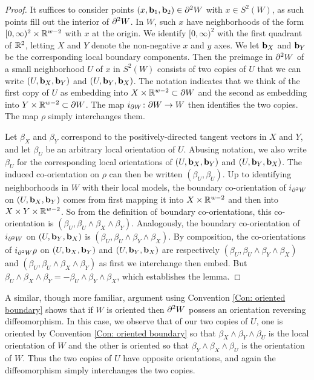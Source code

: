 \begin{proof}
	It suffices to consider points $(x,\mathbf{b}_1,\mathbf{b}_2) \in \partial^2 W$ with $x \in S^2(W)$, as such points fill out the interior of $\partial^2 W$.
	In $W$, such $x$ have neighborhoods of the form $[0,\infty)^2 \times \mathbb{R}^{w-2}$ with $x$ at the origin.
	We identify $[0,\infty)^2$ with the first quadrant of $\mathbb{R}^2$, letting $X$ and $Y$ denote the non-negative $x$ and $y$ axes.
	We let $\mathbf{b}_X$ and $\mathbf{b}_Y$ be the corresponding local boundary components.
	Then the preimage in $\partial^2 W$ of a small neighborhood $U$ of $x$ in $S^2(W)$ consists of two copies of $U$ that we can write $(U,\mathbf{b}_X,\mathbf{b}_Y)$ and $(U,\mathbf{b}_Y,\mathbf{b}_X)$.
	The notation indicates that we think of the first copy of $U$ as embedding into $X \times \mathbb{R}^{w-2} \subset \partial W$ and the second as embedding into $Y \times \mathbb{R}^{w-2} \subset \partial W$.
	The map $i_{\partial W} \colon \partial W \to W$ then identifies the two copies.
	The map $\rho$ simply interchanges them.

	Let $\beta_X$ and $\beta_Y$ correspond to the positively-directed tangent vectors in $X$ and $Y$, and let $\beta_U$ be an arbitrary local orientation of $U$.
	Abusing notation, we also write $\beta_U$ for the corresponding local orientations of $(U,\mathbf{b}_X,\mathbf{b}_Y)$ and $(U,\mathbf{b}_Y,\mathbf{b}_X)$.
	The induced co-orientation on $\rho$ can then be written $(\beta_U,\beta_U)$.
	Up to identifying neighborhoods in $W$ with their local models, the boundary co-orientation of $i_{\partial^2 W}$ on $(U,\mathbf{b}_X,\mathbf{b}_Y)$ comes from first mapping it into $X \times \mathbb{R}^{w-2}$ and then into $X \times Y \times \mathbb{R}^{w-2}$.
	So from the definition of boundary co-orientations, this co-orientation is $(\beta_U, \beta_U \wedge \beta_X \wedge \beta_Y)$.
	Analogously, the boundary co-orientation of $i_{\partial^2 W}$ on $(U,\mathbf{b}_Y,\mathbf{b}_X)$ is $(\beta_U, \beta_U \wedge \beta_Y \wedge \beta_X)$.
	By composition, the co-orientations of $i_{\partial^2 W}\rho$ on $(U,\mathbf{b}_X,\mathbf{b}_Y)$ and $(U,\mathbf{b}_Y,\mathbf{b}_X)$ are respectively $(\beta_U, \beta_U \wedge \beta_Y \wedge \beta_X)$ and $(\beta_U, \beta_U \wedge \beta_X \wedge \beta_Y)$ as first we interchange then embed.
	But $\beta_U \wedge \beta_X \wedge \beta_Y = -\beta_U \wedge \beta_Y \wedge \beta_X$, which establishes the lemma.
\end{proof}

\begin{remark}\label{R: bd2 oriented}
	A similar, though more familiar, argument using Convention \ref{Con: oriented boundary} shows that if $W$ is oriented then $\partial^2 W$ possess an orientation reversing diffeomorphism.
	In this case, we observe that of our two copies of $U$, one is oriented by Convention \ref{Con: oriented boundary} so that $\beta_X \wedge \beta_Y \wedge \beta_U$ is the local orientation of $W$ and the other is oriented so that $\beta_Y \wedge \beta_X \wedge \beta_U$ is the orientation of $W$.
	Thus the two copies of $U$ have opposite orientations, and again the diffeomorphism simply interchanges the two copies.
\end{remark}

